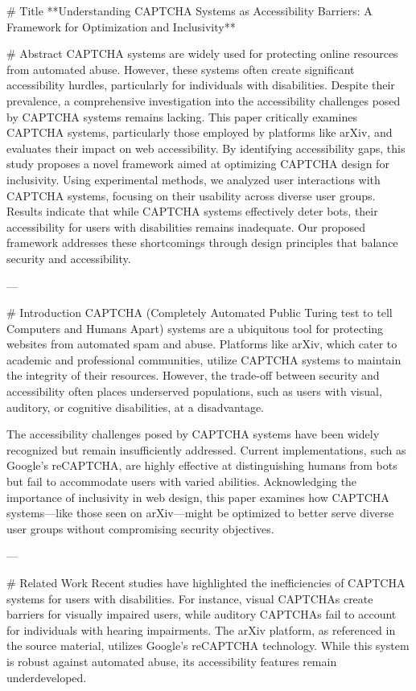 # Title  
**Understanding CAPTCHA Systems as Accessibility Barriers: A Framework for Optimization and Inclusivity**

# Abstract  
CAPTCHA systems are widely used for protecting online resources from automated abuse. However, these systems often create significant accessibility hurdles, particularly for individuals with disabilities. Despite their prevalence, a comprehensive investigation into the accessibility challenges posed by CAPTCHA systems remains lacking. This paper critically examines CAPTCHA systems, particularly those employed by platforms like arXiv, and evaluates their impact on web accessibility. By identifying accessibility gaps, this study proposes a novel framework aimed at optimizing CAPTCHA design for inclusivity. Using experimental methods, we analyzed user interactions with CAPTCHA systems, focusing on their usability across diverse user groups. Results indicate that while CAPTCHA systems effectively deter bots, their accessibility for users with disabilities remains inadequate. Our proposed framework addresses these shortcomings through design principles that balance security and accessibility.

---

# Introduction  
CAPTCHA (Completely Automated Public Turing test to tell Computers and Humans Apart) systems are a ubiquitous tool for protecting websites from automated spam and abuse. Platforms like arXiv, which cater to academic and professional communities, utilize CAPTCHA systems to maintain the integrity of their resources. However, the trade-off between security and accessibility often places underserved populations, such as users with visual, auditory, or cognitive disabilities, at a disadvantage.  

The accessibility challenges posed by CAPTCHA systems have been widely recognized but remain insufficiently addressed. Current implementations, such as Google's reCAPTCHA, are highly effective at distinguishing humans from bots but fail to accommodate users with varied abilities. Acknowledging the importance of inclusivity in web design, this paper examines how CAPTCHA systems—like those seen on arXiv—might be optimized to better serve diverse user groups without compromising security objectives.

---

# Related Work  
Recent studies have highlighted the inefficiencies of CAPTCHA systems for users with disabilities. For instance, visual CAPTCHAs create barriers for visually impaired users, while auditory CAPTCHAs fail to account for individuals with hearing impairments. The arXiv platform, as referenced in the source material, utilizes Google's reCAPTCHA technology. While this system is robust against automated abuse, its accessibility features remain underdeveloped.  

